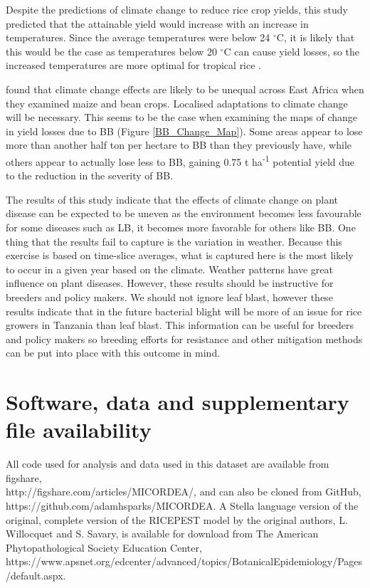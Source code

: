     Despite the predictions of climate change to reduce rice crop yields, this study predicted that the attainable yield would increase with an increase in temperatures. Since the average temperatures were below 24 $^{\circ}$C, it is likely that this would be the case as temperatures below 20 $^{\circ}$C can cause yield losses, so the increased temperatures are more optimal for tropical rice \citep{Yoshida}.
            
    \citet{Thornton2009} found that climate change effects are likely to be unequal across East Africa when they examined maize and bean crops. Localised adaptations to climate change will be necessary. This seems to be the case when examining the maps of change in yield losses due to BB (Figure \ref{BB_Change_Map}). Some areas appear to lose more than another half ton per hectare to BB than they previously have, while others appear to actually lose less to BB, gaining 0.75 t ha\textsuperscript{-1} potential yield due to the reduction in the severity of BB.
    
    The results of this study indicate that the effects of climate change on plant disease can be expected to be uneven as the environment becomes less favourable for some diseases such as LB, it becomes more favorable for others like BB. One thing that the results fail to capture is the variation in weather. Because this exercise is based on time-slice averages, what is captured here is the most likely to occur in a given year based on the climate. Weather patterns have great influence on plant diseases. However, these results should be instructive for breeders and policy makers. We should not ignore leaf blast, however these results indicate that in the future bacterial blight will be more of an issue for rice growers in Tanzania than leaf blast. This information can be useful for breeders and policy makers so breeding efforts for resistance and other mitigation methods can be put into place with this outcome in mind.
    
\section{Software, data and supplementary file availability}
\label{software_and_data_availability}
All code used for analysis and data used in this dataset are available from figshare,\\ http://figshare.com/articles/MICORDEA/, and can also be cloned from GitHub,\\https://github.com/adamhsparks/MICORDEA. A Stella language version of the original, complete version of the RICEPEST model by the original authors, L. Willocquet and S. Savary, is available for download from The American Phytopathological Society Education Center,\\
https://www.apsnet.org/edcenter/advanced/topics/BotanicalEpidemiology/Pages/default.aspx.

